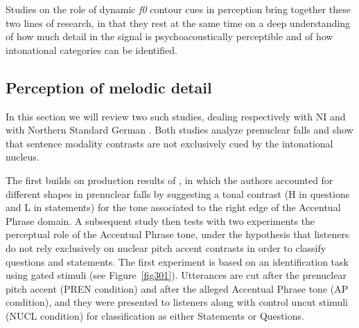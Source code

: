 Studies on the role of dynamic \textit{f0} contour cues in perception bring together these two lines of research, in that they rest at the same time on a deep understanding of how much detail in the signal is psychoacoustically perceptible and of how intonational categories can be identified.

\subsection{Perception of melodic detail}\label{sec311}
In this section we will review two such studies, dealing respectively with NI \citep{petrone2011tones} and with Northern Standard German \citep{petrone2014intonation}. Both studies analyze prenuclear falls and show that sentence modality contrasts are not exclusively cued by the intonational nucleus. 

The first builds on production results of \citet[see Section~\ref{sec241}]{petrone2008tonal}, in which the authors accounted for different shapes in prenuclear falls by suggesting a tonal contrast (H in questions and L in statements) for the tone associated to the right edge of the Accentual Phrase domain. A subsequent study \citep{petrone2011tones} then tests with two experiments the perceptual role of the Accentual Phrase tone, under the hypothesis that listeners do not rely exclusively on nuclear pitch accent contrasts in order to classify questions and statements. The first experiment is based on an identification task using gated stimuli (see Figure~\ref{fig301}). Utterances are cut after the prenuclear pitch accent (PREN condition) and after the alleged Accentual Phrase tone (AP condition), and they were presented to listeners along with control uncut stimuli (NUCL condition) for classification as either Statements or Questions. 

